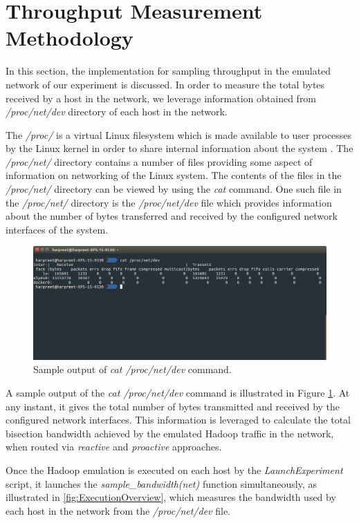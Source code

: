 \section{Throughput Measurement Methodology} \label{sec:ThroughputMeasure}

In this section, the implementation for sampling throughput in the emulated network of our experiment is discussed. In order to measure the total bytes received by a host in the network, we leverage information obtained from \textit{/proc/net/dev} directory of each host in the network.  

The \textit{/proc/} is a virtual Linux filesystem which is made available to user processes by the Linux kernel in order to share internal information about the system \cite{proc}. The \textit{/proc/net/} directory contains a number of files providing some aspect of information on networking of the Linux system. The contents of the files in the \textit{/proc/net/} directory can be viewed by using the \textit{cat} command. One such file in the \textit{/proc/net/} directory is the \textit{/proc/net/dev} file which provides information about the number of bytes transferred and received by the configured network interfaces of the system.      
\begin{figure}[!ht] 
	\centerline{\includegraphics[scale=0.35]{graphics/chapter5/SamplingExample.png}}
	\caption{Sample output of \textit{cat /proc/net/dev} command.}
	\label{fig:ThroughputSamplingEg}
\end{figure}

A sample output of the \textit{cat /proc/net/dev} command is illustrated in Figure \ref{fig:ThroughputSamplingEg}. At any instant, it gives the total number of bytes transmitted and received by the configured network interfaces. This information is leveraged to calculate the total bisection bandwidth achieved by the emulated Hadoop traffic in the network, when routed via \textit{reactive} and \textit{proactive} approaches. 

Once the Hadoop emulation is executed on each host by the \textit{LaunchExperiment} script, it launches the \textit{sample\_bandwidth(net)} function simultaneously, as illustrated in \ref{fig:ExecutionOverview}, which measures the bandwidth used by each host in the network from the \textit{/proc/net/dev} file.

